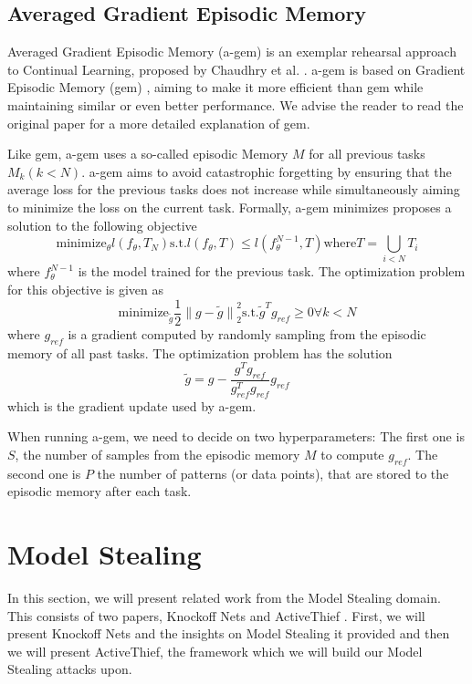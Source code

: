 \subsection{Averaged Gradient Episodic Memory}
\label{sec:Related_work:Continual_Learning:AGEM}
Averaged Gradient Episodic Memory (\gls{a-gem}) is an exemplar rehearsal approach to Continual Learning, proposed by Chaudhry et al. \cite{chaudhry2018efficient}.
\gls{a-gem} is based on Gradient Episodic Memory (\gls{gem}) \cite{lopez2017gradient}, aiming to make it more efficient than \gls{gem} while maintaining similar or
even better performance. We advise the reader to read the original paper for a more detailed explanation of \gls{gem}. \par
Like \gls{gem}, \gls{a-gem} uses a so-called episodic Memory $M$ for all previous tasks $M_k (k<N)$. \gls{a-gem} aims to avoid catastrophic forgetting by ensuring
that the average loss for the previous tasks does not increase while simultaneously aiming to minimize the loss on the current task. Formally, \gls{a-gem} minimizes
proposes a solution to the following objective 
\begin{equation}
    \text{minimize}_\theta l(f_\theta,T_N) \text{s.t.} l(f_\theta,T) \leq l(f_\theta^{N-1},T) \text{where} T = \bigcup_{i<N} T_i
\end{equation}
where $f_\theta^{N-1}$ is the model trained for the previous task. The optimization problem for this objective is given as
\begin{equation}
    \text{minimize}_{\tilde{g}} \frac{1}{2} {\lVert g - \tilde{g} \rVert}^2_2 \text{s.t.} \tilde{g}^T g_{ref} \geq 0 \forall k < N
\end{equation}
where $g_{ref}$ is a gradient computed by randomly sampling from the episodic memory of all past tasks. The optimization problem has the solution 
\begin{equation}
    \tilde{g} = g - \frac{g^T g_{ref}}{g^T_{ref} g_{ref}} g_{ref}
\end{equation}
which is the gradient update used by \gls{a-gem}. \par
When running \gls{a-gem}, we need to decide on two hyperparameters: The first one is $S$, the number of samples from the episodic memory $M$ to compute $g_{ref}$. The second
one is $P$ the number of patterns (or data points), that are stored to the episodic memory after each task.


\section{Model Stealing}
\label{sec:Related_work:Model_Stealing}
In this section, we will present related work from the Model Stealing domain. This consists of two papers, Knockoff Nets \cite{orekondy2019knockoff} and
ActiveThief \cite{pal2020activethief}. First, we will present Knockoff Nets and the insights on Model Stealing it provided and then we will present ActiveThief,
the framework which we will build our Model Stealing attacks upon.

